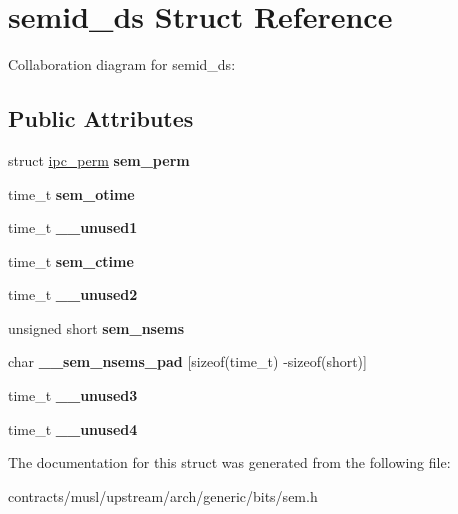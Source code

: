 \hypertarget{structsemid__ds}{}\section{semid\+\_\+ds Struct Reference}
\label{structsemid__ds}


Collaboration diagram for semid\+\_\+ds\+:
\subsection*{Public Attributes}
\begin{DoxyCompactItemize}
\item 
\mbox{\label{structsemid__ds_a1f491472af758f1aad0f1fe42cc7e720}} 
struct \mbox{\hyperlink{structipc__perm}{ipc\+\_\+perm}} {\bfseries sem\+\_\+perm}
\item 
\mbox{\label{structsemid__ds_aa98bc64fece285ce5e785de7ecdf436a}} 
time\+\_\+t {\bfseries sem\+\_\+otime}
\item 
\mbox{\label{structsemid__ds_ada96c8a70e07ef872024e0574f27c481}} 
time\+\_\+t {\bfseries \+\_\+\+\_\+unused1}
\item 
\mbox{\label{structsemid__ds_a48d85cba413fe91bab0e86c33a2135dd}} 
time\+\_\+t {\bfseries sem\+\_\+ctime}
\item 
\mbox{\label{structsemid__ds_a74ff066bb33f5c9263aadbd7ebbf7628}} 
time\+\_\+t {\bfseries \+\_\+\+\_\+unused2}
\item 
\mbox{\label{structsemid__ds_af077c25f7c2a2846e3b7a16f66ebe312}} 
unsigned short {\bfseries sem\+\_\+nsems}
\item 
\mbox{\label{structsemid__ds_abd3c30ed62524cb4de293fa552f0e936}} 
char {\bfseries \+\_\+\+\_\+sem\+\_\+nsems\+\_\+pad} \mbox{[}sizeof(time\+\_\+t) -\/sizeof(short)\mbox{]}
\item 
\mbox{\label{structsemid__ds_a9b2eef6988ff995c7cabd4f183a58d2d}} 
time\+\_\+t {\bfseries \+\_\+\+\_\+unused3}
\item 
\mbox{\label{structsemid__ds_a784bff3687558877b98925bed44f3de8}} 
time\+\_\+t {\bfseries \+\_\+\+\_\+unused4}
\end{DoxyCompactItemize}


The documentation for this struct was generated from the following file\+:\begin{DoxyCompactItemize}
\item 
contracts/musl/upstream/arch/generic/bits/sem.\+h\end{DoxyCompactItemize}
